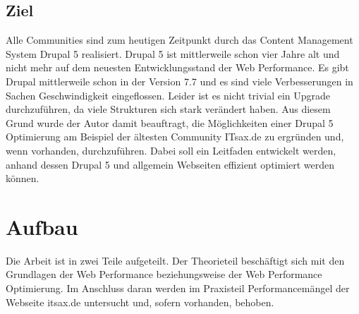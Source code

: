\subsection{Ziel}
Alle Communities sind zum heutigen Zeitpunkt durch das Content Management System Drupal 5 realisiert. Drupal 5 ist mittlerweile schon vier Jahre alt und nicht mehr auf dem neuesten Entwicklungsstand der Web Performance. Es gibt Drupal mittlerweile schon in der Version 7.7 und es sind viele Verbesserungen in Sachen Geschwindigkeit eingeflossen. Leider ist es nicht trivial ein Upgrade durchzuführen, da viele Strukturen sich stark verändert haben. Aus diesem Grund wurde der Autor damit beauftragt, die Möglichkeiten einer Drupal 5 Optimierung am Beispiel der ältesten Community ITsax.de zu ergründen und, wenn vorhanden, durchzuführen. Dabei soll ein Leitfaden entwickelt werden, anhand dessen Drupal 5 und allgemein Webseiten effizient optimiert werden können.

\section{Aufbau}
Die Arbeit ist in zwei Teile aufgeteilt. Der Theorieteil beschäftigt sich mit den Grundlagen der Web Performance beziehungsweise der Web Performance Optimierung. Im Anschluss daran werden im Praxisteil Performancemängel der Webseite itsax.de untersucht und, sofern vorhanden, behoben. 
